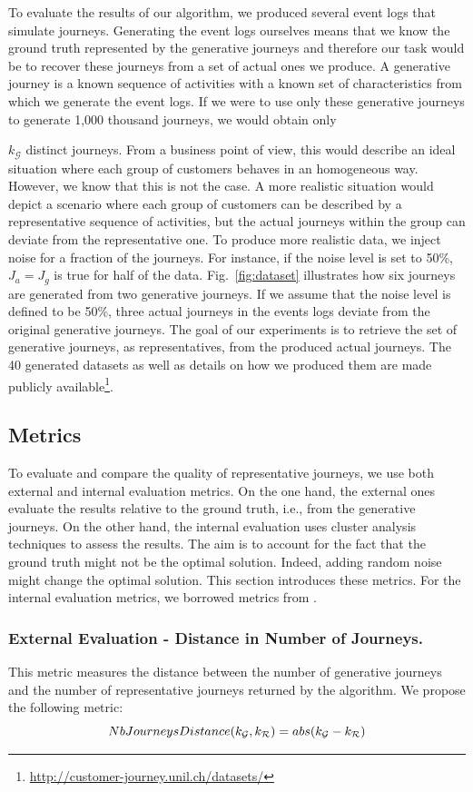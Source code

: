 \documentclass[runningheads]{llncs}
\begin{document}
To evaluate the results of our algorithm, we produced several event logs that simulate journeys. Generating the event logs ourselves means that we know the ground truth represented by the generative journeys and therefore our task would be to recover these journeys from a set of actual ones we produce. A generative journey is a known sequence of activities with a known set of characteristics from which we generate the event logs. If we were to use only these generative journeys to generate 1,000 thousand journeys, we would obtain only {$k_{\mathcal{G}}$ distinct journeys. From a business point of view, this would describe an ideal situation where each group of customers behaves in an homogeneous way. However, we know that this is not the case. A more realistic situation would depict a scenario where each group of customers can be described by a representative sequence of activities, but the actual journeys within the group can deviate from the representative one. To produce more realistic data, we inject noise for a fraction of the journeys. For instance, if the noise level is set to 50\%, $J_a = J_g$ is true for half of the data. Fig.~\ref{fig:dataset} illustrates how six journeys are generated from two generative journeys. If we assume that the noise level is defined to be 50\%, three actual journeys in the events logs deviate from the original generative journeys. The goal of our experiments is to retrieve the set of generative journeys, as representatives, from the produced actual journeys. The 40 generated datasets as well as details on how we produced them are made publicly available\footnote{\url{http://customer-journey.unil.ch/datasets/}}.

\subsection{Metrics}
To evaluate and compare the quality of representative journeys, we use both external and internal evaluation metrics. On the one hand, the external ones evaluate the results relative to the ground truth, i.e., from the generative journeys. On the other hand, the internal evaluation uses cluster analysis techniques to assess the results. The aim is to account for the fact that the ground truth might not be the optimal solution. Indeed, adding random noise might change the optimal solution. This section introduces these metrics. For the internal evaluation metrics, we borrowed metrics from \cite{gabadinho2009extracting}.


\subsubsection{External Evaluation - Distance in Number of Journeys.} This metric measures the distance between the number of generative journeys and the number of representative journeys returned by the algorithm. We propose the following metric:
\begin{equation}
\footnotesize
    NbJourneysDistance({k_{\mathcal{G}}}, {k_{\mathcal{R}}}) = abs({k_{\mathcal{G}}} - {k_{\mathcal{R}}}) 
\end{equation}

}
\end{document}
